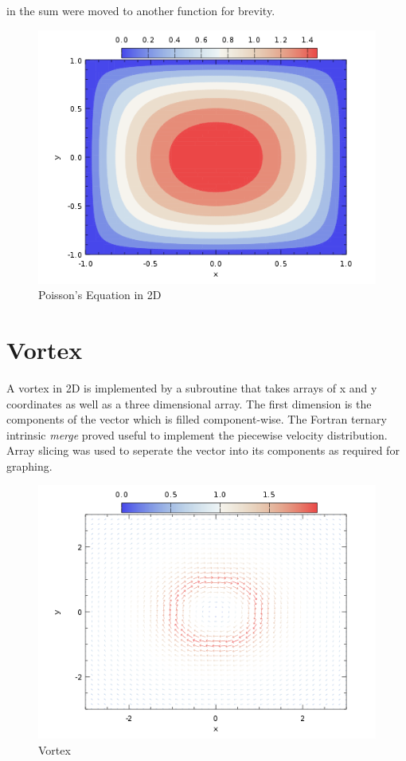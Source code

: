 \documentclass[12pt,twocolumn]{article}
\begin{document}
in the sum were moved to another function for brevity.
\begin{figure}
\includegraphics[width=\columnwidth]{2dheat.png}
\footnotesize{\caption{Poisson's Equation in 2D}}
\end{figure}
\section*{Vortex}
A vortex in 2D is implemented by a subroutine that takes arrays of x and y coordinates as well as a three dimensional array. The 
first dimension is the components of the vector which is filled component-wise. The Fortran ternary intrinsic \emph{merge} proved 
useful to implement the piecewise velocity distribution. Array slicing was used to seperate the vector into its components as required 
for graphing.
\begin{figure}
\includegraphics[width=\columnwidth]{vortex.png}
\footnotesize{\caption{Vortex}}
\end{figure}
\end{document}
